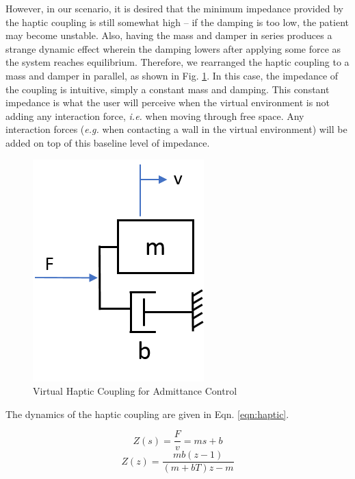 \documentclass[12pt]{report}
\begin{document}
	However, in our scenario, it is desired that the minimum impedance provided by the haptic coupling is still somewhat high -- if the damping is too low, the patient may become unstable. Also, having the mass and damper in series produces a strange dynamic effect wherein the damping lowers after applying some force as the system reaches equilibrium. Therefore, we rearranged the haptic coupling to a mass and damper in parallel, as shown in Fig. \ref{fig:haptic_coupling}. In this case, the impedance of the coupling is intuitive, simply a constant mass and damping. This constant impedance is what the user will perceive when the virtual environment is not adding any interaction force, \textit{i.e.} when moving through free space. Any interaction forces (\textit{e.g.} when contacting a wall in the virtual environment) will be added on top of this baseline level of impedance. 
	
	\begin{figure}[h] 
		\centering
		\includegraphics[width=0.3\linewidth]{haptic_coupling}
		\caption{Virtual Haptic Coupling for Admittance Control}
		\label{fig:haptic_coupling}
	\end{figure} 

		
		
	
	
	The dynamics of the haptic coupling are given in Eqn. \ref{eqn:haptic}. 
	
	\begin{equation} \label{eqn:haptic}
		Z(s) = \frac{F}{v} = ms + b  
	\end{equation}
	\begin{equation}
		Z(z) = \frac{mb(z-1)}{(m+bT)z - m}
	\end{equation}
	
\end{document}
